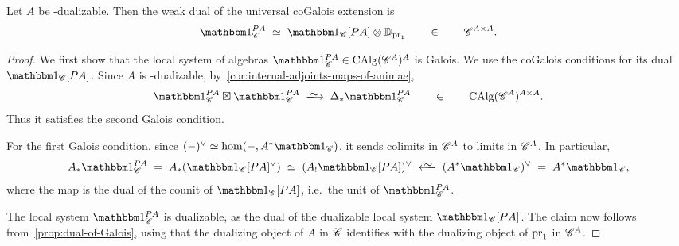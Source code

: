 \documentclass[english,svgnames,table]{article}
\begin{document}
    \begin{corollary}
    \label{cor:dual-of-trivial-Galois}
        Let $A$ be \COB-dualizable. Then the weak dual of the universal coGalois extension is
        \begin{equation*}
            \ounit_{\cC}^{\Path A} \;\simeq\; \ounit_{\cC}[\Path A] \otimes \DD_{\pr_1} \qin \cC^{A \times A}.
        \end{equation*}
    \end{corollary}
    \begin{proof}
        We first show that the local system of algebras $\ounit_{\cC}^{\Path A} \in \CAlg(\cC^A)^A$ is Galois. 
        We use the coGalois conditions for its dual $\ounit_{\cC}[\Path A]$.
        Since $A$ is \COB-dualizable, by~\cref{cor:internal-adjoints-maps-of-animae},
        \begin{equation*}
            \ounit_{\cC}^{\Path A} \boxtimes \ounit_{\cC}^{\Path A} \;\isotoo\; \Delta_* \ounit_{\cC}^{\Path A} \qin \CAlg(\cC^A)^{A \times A}.
        \end{equation*}
        Thus it satisfies the second Galois condition.
        
        For the first Galois condition, since $(-)\dual \simeq \hom(-, A^* \ounit_{\cC})$, it sends colimits in $\mathscr{C}^A$ to limits in $\mathscr{C}^A$. In particular,
        \begin{equation*}
            A_* \ounit_{\cC}^{\Path A} \;=\; A_* (\ounit_{\cC}[\Path A]\dual) \;\simeq\; (A_! \ounit_{\cC}[\Path A])\dual \;\isogetss\; (A^*\ounit_{\cC})\dual \;=\; A^*\ounit_{\cC},
        \end{equation*}
        where the map is the dual of the counit of $\ounit_{\cC}[\Path A]$, i.e.\ the unit of $\ounit_{\cC}^{\Path A}$.

        The local system $\ounit_{\cC}^{\Path A}$ is dualizable, as the dual of the dualizable local system $\ounit_{\cC}[\Path A]$.
        The claim now follows from~\cref{prop:dual-of-Galois}, using that the dualizing object of $A$ in $\mathscr{C}$ identifies with the dualizing object of $\mathrm{pr}_1$ in $\mathscr{C}^A$.
    \end{proof}
\end{document}
